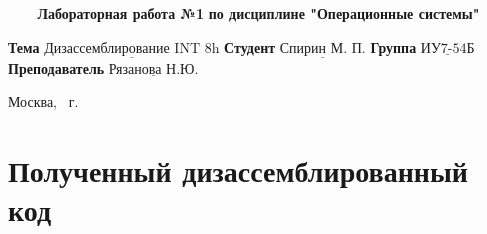 \documentclass[a4paper,14pt]{article}
\begin{document}
\begin{titlepage}
	\begin{center}
		\noindent\begin{minipage}{1.0\textwidth}\centering
			\Large\textbf{   ~~~ Лабораторная работа №1}\newline
			\textbf{по дисциплине "Операционные системы"}\newline
		\end{minipage}
	\end{center}
	\noindent\textbf{Тема} $\underline{\text{Дизассемблирование INT 8h}}$\newline\newline
	\noindent\textbf{Студент} $\underline{\text{Спирин М. П.}}$\newline\newline
	\noindent\textbf{Группа} $\underline{\text{ИУ7-54Б}}$\newline\newline
	\noindent\textbf{Преподаватель} $\underline{\text{Рязанова Н.Ю.}}$\newline

	\begin{center}
		\mbox{}
		\vfill
		Москва, \the\year ~г.
	\end{center}
	\clearpage
\end{titlepage}

\section{Полученный дизассемблированный код}
\end{document}
